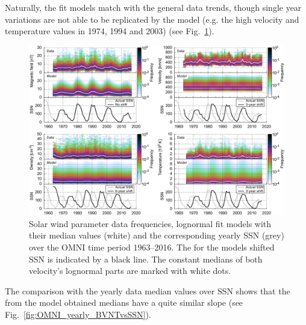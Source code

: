 Naturally, the fit models match with the general data trends, though single year variations are not able to be replicated by the model (e.g. the high velocity and temperature values in 1974, 1994 and 2003) (see Fig.~\ref{fig:OMNI_yearly_BVdblNTSSN_fit_d_plot}).
\begin{figure}
	\includegraphics[width=18cm]{figures/OMNI_yearly_BVdblNTSSN_fit_d_plot.pdf}
	\caption{Solar wind parameter data frequencies, lognormal fit models with their median values (white) and the corresponding yearly SSN (grey) over the OMNI time period 1963--2016. The for the models shifted SSN is indicated by a black line. The constant medians of both velocity's lognormal parts are marked with white dots.}
	\label{fig:OMNI_yearly_BVdblNTSSN_fit_d_plot}
\end{figure}
The comparison with the yearly data median values over SSN shows that the from the model obtained medians have a quite similar slope (see Fig.~\ref{fig:OMNI_yearly_BVNTvsSSN}).\\
